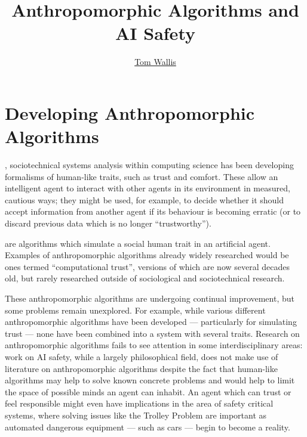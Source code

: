
\title{Anthropomorphic Algorithms and AI Safety}
\author[Tom Wallis]{\href{http://tom.coffee/}{Tom Wallis}}
\date{}



\maketitle

\section{Developing Anthropomorphic Algorithms}

, sociotechnical systems analysis within computing science has been developing formalisms of human-like traits, such as trust and comfort. These allow an intelligent agent to interact with other agents in its environment in measured, cautious ways; they might be used, for example, to decide whether it should accept information from another agent if its behaviour is becoming erratic (or to discard previous data which is no longer ``trustworthy'').\par

 are algorithms which simulate a social human trait in an artificial agent. Examples of anthropomorphic algorithms already widely researched would be ones termed ``computational trust'', versions of which are now several decades old\cite{marsh1994}, but rarely researched outside of sociological and sociotechnical research.\par
These anthropomorphic algorithms are undergoing continual improvement\cite{kramdi, Urbano2014}, but some problems remain unexplored. For example, while various different anthropomorphic algorithms have been developed --- particularly for simulating trust --- none have been combined into a system with several traits. Research on anthropomorphic algorithms fails to see attention in some interdisciplinary areas: work on AI safety, while a largely philosophical field, does not make use of literature on anthropomorphic algorithms despite the fact that human-like algorithms may help to solve known concrete problems\cite{concrete_problems} and would help to limit the space of possible minds an agent can inhabit.\cite{sloman_spaceofminds} An agent which can trust or feel responsible might even have implications in the area of safety critical systems, where solving issues like the Trolley Problem are important as automated dangerous equipment --- such as cars --- begin to become a reality.\par

